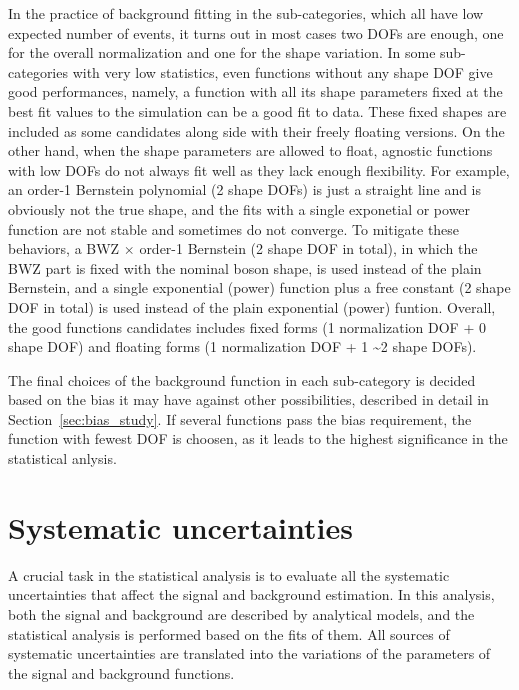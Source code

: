 In the practice of background fitting in the \VH sub-categories, which all have low expected number of events,
it turns out in most cases two DOFs are enough, one for the overall normalization and one for the shape variation.
In some sub-categories with very low statistics, even functions without any shape DOF give good performances,
namely, a function with all its shape parameters fixed at the best fit values to the simulation can be a good fit to data.
These fixed shapes are included as some candidates along side with their freely floating versions.
On the other hand, when the shape parameters are allowed to float, 
agnostic functions with low DOFs do not always fit well as they lack enough flexibility.
For example, an order-1 Bernstein polynomial (2 shape DOFs) is just a straight line and is obviously not the true \mmm shape,
and the fits with a single exponetial or power function are not stable and sometimes do not converge.
To mitigate these behaviors, a BWZ $\times$ order-1 Bernstein (2 shape DOF in total), in which the BWZ part is fixed with the nominal \PZ boson shape, is used instead of the plain Bernstein,
and a single exponential (power) function plus a free constant (2 shape DOF in total) is used instead of the plain exponential (power) funtion.
Overall, the good functions candidates includes fixed forms (1 normalization DOF + 0 shape DOF) and 
floating forms (1 normalization DOF + 1 \sim 2 shape DOFs).

The final choices of the background function in each sub-category is decided based on 
the bias it may have against other possibilities, described in detail in Section~\ref{sec:bias_study}.
If several functions pass the bias requirement, the function with fewest DOF is choosen, 
as it leads to the highest significance in the statistical anlysis.


\clearpage
\section{Systematic uncertainties}\label{sec:vh_systematics}

A crucial task in the statistical analysis is to evaluate all the systematic uncertainties 
that affect the signal and background estimation.
In this analysis, both the signal and background are described by analytical models,  
and the statistical analysis is performed based on the fits of them.
All sources of systematic uncertainties are translated into the 
variations of the parameters of the signal and background functions.

